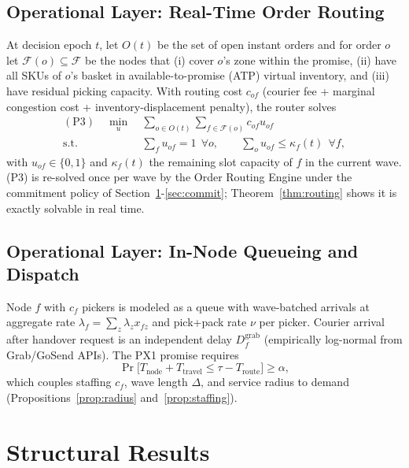 \documentclass[10pt,twocolumn,letterpaper]{article}
\theoremstyle{definition}
\begin{document}
\subsection{Operational Layer: Real-Time Order Routing}

At decision epoch $t$, let $O(t)$ be the set of open instant orders and for order $o$ let $\mathcal{F}(o)\subseteq\mathcal{F}$ be the nodes that (i) cover $o$'s zone within the promise, (ii) have all SKUs of $o$'s basket in available-to-promise (ATP) virtual inventory, and (iii) have residual picking capacity. With routing cost $c_{of}$ (courier fee + marginal congestion cost + inventory-displacement penalty), the router solves
\begin{align}
(\mathrm{P3})\quad\min_u\ &\sum_{o\in O(t)}\sum_{f\in\mathcal{F}(o)}c_{of}u_{of}\label{eq:p3}\\
\text{s.t.}\ &\textstyle\sum_f u_{of}=1\ \ \forall o,\qquad \sum_o u_{of}\le\kappa_f(t)\ \ \forall f,\nonumber
\end{align}
with $u_{of}\in\{0,1\}$ and $\kappa_f(t)$ the remaining slot capacity of $f$ in the current wave. (P3) is re-solved once per wave by the Order Routing Engine under the commitment policy of Section~\ref{sec:structural}-\ref{sec:commit}; Theorem~\ref{thm:routing} shows it is exactly solvable in real time.

\subsection{Operational Layer: In-Node Queueing and Dispatch}

Node $f$ with $c_f$ pickers is modeled as a queue with wave-batched arrivals at aggregate rate $\lambda_f=\sum_z\lambda_zx_{fz}$ and pick+pack rate $\nu$ per picker. Courier arrival after handover request is an independent delay $D^{\mathrm{grab}}_f$ (empirically log-normal from Grab/GoSend APIs). The PX1 promise requires
\begin{equation}\label{eq:px1}
\Pr\bigl[T_{\mathrm{node}}+T_{\mathrm{travel}}\le\tau-T_{\mathrm{route}}\bigr]\ge\alpha,
\end{equation}
which couples staffing $c_f$, wave length $\Delta$, and service radius to demand (Propositions~\ref{prop:radius} and~\ref{prop:staffing}).

\section{Structural Results}\label{sec:structural}
\end{document}
